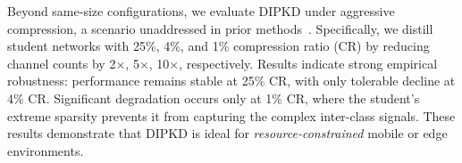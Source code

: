 \begin{foldable}
  Beyond same-size configurations, we evaluate DIPKD under aggressive compression, a scenario unaddressed in prior methods~\cite{wang2021zero,zhang2022ideal,yuan2024data}.
  Specifically, we distill student networks with 25\%, 4\%, and 1\% compression ratio (CR) by reducing channel counts by 2$\times$, 5$\times$, 10$\times$, respectively.
  Results indicate strong empirical robustness: performance remains stable at 25\% CR, with only tolerable decline at 4\% CR.
  Significant degradation occurs only at 1\% CR, where the student's extreme sparsity prevents it from capturing the complex inter-class signals.
  These results demonstrate that DIPKD is ideal for \textit{resource-constrained} mobile or edge environments.
\end{foldable}
